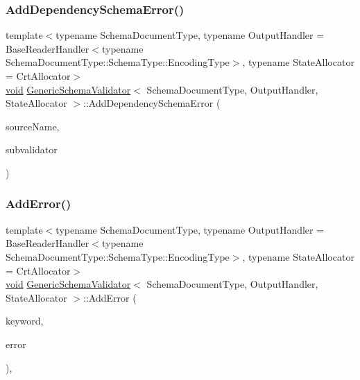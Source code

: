 \mbox{\label{classGenericSchemaValidator_a27542a75617cdc28f6846b594fe01229}} 
\subsubsection{\texorpdfstring{Add\+Dependency\+Schema\+Error()}{AddDependencySchemaError()}}
{\footnotesize\ttfamily template$<$typename Schema\+Document\+Type, typename Output\+Handler = Base\+Reader\+Handler$<$typename Schema\+Document\+Type\+::\+Schema\+Type\+::\+Encoding\+Type$>$, typename State\+Allocator = Crt\+Allocator$>$ \\
\hyperlink{imgui__impl__opengl3__loader_8h_ac668e7cffd9e2e9cfee428b9b2f34fa7}{void} \hyperlink{classGenericSchemaValidator}{Generic\+Schema\+Validator}$<$ Schema\+Document\+Type, Output\+Handler, State\+Allocator $>$\+::Add\+Dependency\+Schema\+Error (\begin{DoxyParamCaption}\item[{const \hyperlink{classGenericSchemaValidator_a3c004e35c7eb9fa5a28c0ccfb8ac62dc}{S\+Value} \&}]{source\+Name,  }\item[{I\+Schema\+Validator $\ast$}]{subvalidator }\end{DoxyParamCaption})\hspace{0.3cm}{\ttfamily [inline]}}

\mbox{\label{classGenericSchemaValidator_a0dcd3dedf97c2ccff9de5b194447f175}} 
\subsubsection{\texorpdfstring{Add\+Error()}{AddError()}}
{\footnotesize\ttfamily template$<$typename Schema\+Document\+Type, typename Output\+Handler = Base\+Reader\+Handler$<$typename Schema\+Document\+Type\+::\+Schema\+Type\+::\+Encoding\+Type$>$, typename State\+Allocator = Crt\+Allocator$>$ \\
\hyperlink{imgui__impl__opengl3__loader_8h_ac668e7cffd9e2e9cfee428b9b2f34fa7}{void} \hyperlink{classGenericSchemaValidator}{Generic\+Schema\+Validator}$<$ Schema\+Document\+Type, Output\+Handler, State\+Allocator $>$\+::Add\+Error (\begin{DoxyParamCaption}\item[{\hyperlink{classGenericSchemaValidator_a435890a2dddeecb896d4ac76de03ca68}{Value\+Type} \&}]{keyword,  }\item[{\hyperlink{classGenericSchemaValidator_a435890a2dddeecb896d4ac76de03ca68}{Value\+Type} \&}]{error }\end{DoxyParamCaption})\hspace{0.3cm}{\ttfamily [inline]}, {\ttfamily [private]}}

